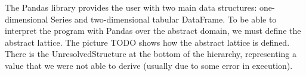 
\Large
The Pandas library provides the user with two main data structures: one-dimensional Series
and two-dimensional tabular DataFrame.
To be able to interpret the program with Pandas over the abstract domain, we must define the abstract lattice.
The picture TODO shows how the abstract lattice is defined.
There is the UnresolvedStructure at the bottom of the hierarchy, representing a value that we were not
able to derive (usually due to some error in execution).
